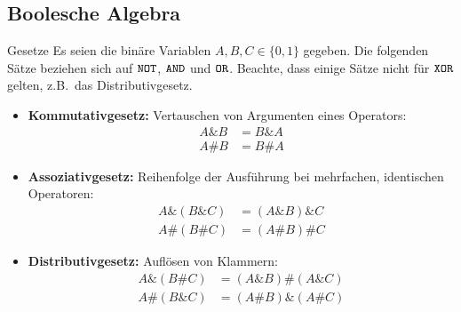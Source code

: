 \subsection{Boolesche Algebra}\label{subsec:boolesche-algebra}

\begin{definition}{Gesetze}
    Es seien die binäre Variablen $A,B,C \in \{ 0,1 \}$ gegeben.
    Die folgenden Sätze beziehen sich auf $\texttt{NOT}$, $\texttt{AND}$ und $\texttt{OR}$.
    Beachte, dass einige Sätze nicht für $\texttt{XOR}$ gelten, z.B.\ das Distributivgesetz.
    \begin{itemize}
        \item \textbf{Kommutativgesetz:} Vertauschen von Argumenten eines Operators:
        \begin{align*}
            A \& B &= B \& A \\
            A \# B &= B \# A
        \end{align*}
        \item \textbf{Assoziativgesetz:} Reihenfolge der Ausführung bei mehrfachen, identischen Operatoren:
        \begin{align*}
            A \& (B \& C) &= (A \& B) \& C \\
            A \# (B \# C) &= (A \# B) \# C
        \end{align*}
        \item \textbf{Distributivgesetz:} Auflösen von Klammern:
        \begin{align*}
            A \& (B \# C) &= (A \& B) \# (A \& C) \\
            A \# (B \& C) &= (A \# B) \& (A \# C)
        \end{align*}
    \end{itemize}
\end{definition}
